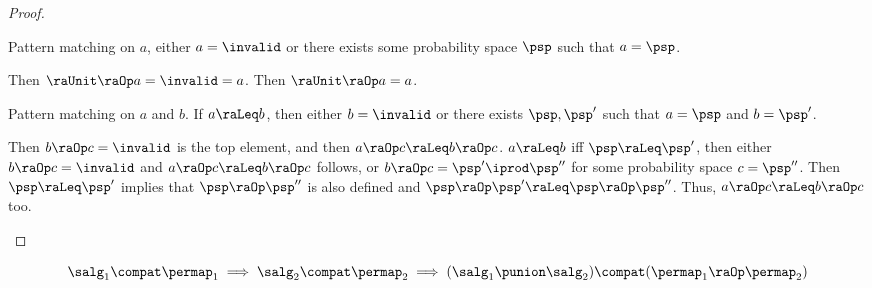 \documentclass[acmsmall,nonacm,screen,appendix]{acmart}
\begin{document}
\begin{proof}
\begin{induction}
    \step[Condition~$\raUnit \raOp a = a$]
      Pattern matching on $a$,
      either $a = \invalid$
      or there exists some probability space $\psp$ such that $a = \psp$.
      \begin{casesplit}
        \case[$a = \invalid$] Then $\raUnit \raOp a = \invalid = a$.
        \case[$a = \psp$] Then $\raUnit \raOp a = a$.
      \end{casesplit}

      Pattern matching on $a$ and $b$.
      If $a \raLeq b $,
      then either $b = \invalid$ or there exists
       $\psp, \psp'$ such that $a = \psp$ and $b = \psp'$.
       \begin{casesplit}
         \case[$b = \invalid$] Then $b \raOp c = \invalid$ is the top element,
       and then $a \raOp c \raLeq b \raOp c$.
         \case[Otherwise]
       $a \raLeq b$ iff $\psp \raLeq \psp'$,
       then either $b \raOp c = \invalid$ and $a \raOp c \raLeq b \raOp c$ follows,
       or  $b \raOp c = \psp' \iprod \psp''$
       for some probability space $c = \psp''$.
       Then $\psp \raLeq \psp'$ implies that
       $\psp \raOp \psp''$ is also defined and
       $\psp \raOp \psp' \raLeq \psp \raOp \psp''$.
       Thus, $a \raOp c \raLeq b \raOp c$ too.
       \qedhere
      \end{casesplit}
  \end{induction}
\end{proof}




\begin{lemma} 
  \label{lemma:well-defined-psppmra-1}
   \[
  \salg_1\compat\permap_1
  \implies
  \salg_2\compat\permap_2
  \implies
    (\salg_1 \punion \salg_2)\compat(\permap_1 \raOp \permap_2)
  \]
\end{lemma}
\end{document}

